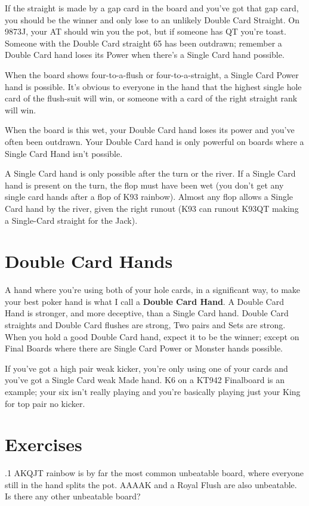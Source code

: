 If the straight is made by a gap card in the board and you've got that
gap card, you should be the winner and only lose to an unlikely Double
Card Straight. On 9873J, your AT should win you the pot, but if
someone has QT you're toast. Someone with the Double Card straight 65
has been outdrawn; remember a Double Card hand loses its Power when
there's a Single Card hand possible.

When the board shows four-to-a-flush or four-to-a-straight, a Single
Card Power hand is possible. It's obvious to everyone in the hand that
the highest single hole card of the flush-suit will win, or someone
with a card of the right straight rank will win.

When the board is this wet, your Double Card hand loses its power and
you've often been outdrawn. Your Double Card hand is only powerful on
boards where a Single Card Hand isn't possible.

A Single Card hand is only possible after the turn or the river. If a
Single Card hand is present on the turn, the flop must have been wet
(you don't get any single card hands after a flop of K93
rainbow). Almost any flop allows a Single Card hand by the river,
given the right runout (K93 can runout K93QT making a Single-Card
straight for the Jack).

\section{Double Card Hands}

A hand where you're using both of your hole cards, in a significant
way, to make your best poker hand is what I call a \textbf{Double Card
Hand}. A Double Card Hand is stronger, and more deceptive, than a
Single Card hand. Double Card straights and Double Card flushes are
strong, Two pairs and Sets are strong. When you hold a good Double
Card hand, expect it to be the winner; except on Final Boards where
there are Single Card Power or Monster hands possible.

If you've got a high pair weak kicker, you're only using one of your
cards and you've got a Single Card weak Made hand. K6 on a KT942
Finalboard is an example; your six isn't really playing and you're
basically playing just your King for top pair no kicker.


\section{Exercises}

.1 AKQJT rainbow is by far the most common unbeatable
board, where everyone still in the hand splits the pot. AAAAK and a
Royal Flush are also unbeatable. Is there any other unbeatable board?
